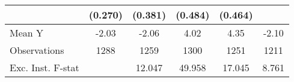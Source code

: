{\begin{tabular}{l*{5}{c}}
            &     (0.270)         &     (0.381)         &     (0.484)         &     (0.464)         &                     \\
\midrule
Mean Y      &       -2.03         &       -2.06         &        4.02         &        4.35         &       -2.10         \\
Observations&        1288         &        1259         &        1300         &        1251         &        1211         \\
Exc. Inst. F-stat&                     &      12.047         &      49.958         &      17.045         &       8.761         \\
\bottomrule
\end{tabular}
}
